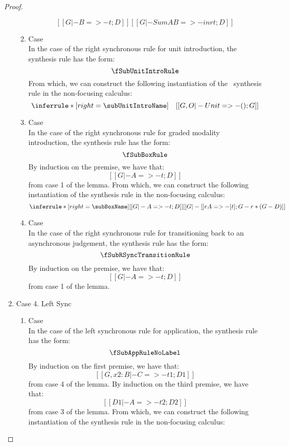 \begin{proof}
\begin{enumerate}
\begin{enumerate}
\[    {[[G |- B =>- t ; D]]}
    {[[G |- Sum A B =>- inr t ; D]]}
          \]
        \item Case \subUnitIntroName \\
          In the case of the right synchronous rule for unit introduction, the synthesis rule has the form:
          \[
          \fSubUnitIntroRule
          \]
          From which, we can construct the following instantiation of the \subUnitIntroName\ synthesis rule in the non-focusing calculus:
          \[
    \inferrule*[right=\subUnitIntroName]
    {\quad}
    {[[G , O |- Unit =>- () ; G]]}
          \]
        \item Case \subBoxName \\
          In the case of the right synchronous rule for graded modality introduction, the synthesis rule has the form:
          \[
          \fSubBoxRule
          \]
          By induction on the premise, we have that:
          \[
            [[G |- A =>- t ; D]] \tag{ih}
          \]
          from case 1 of the lemma. From which, we can construct the following instantiation of the \subBoxName synthesis rule in the non-focusing calculus:
          \[
  \inferrule*[right=\subBoxName]
  {[[G |- A =>- t ; D]]}{[[G |- [] r A =>- [t] ; G - r * (G - D)]]}
          \]
      \item Case \fSubRSyncTransitionName \\
          In the case of the right synchronous rule for transitioning back to an asynchronous judgement, the synthesis rule has the form:
          \[
            \fSubRSyncTransitionRule
          \]
          By induction on the premise, we have that:
          \[
            [[ G |- A =>- t ; D ]] \tag{ih}
          \]
          from case 1 of the lemma.
      \end{enumerate}
    \item Case 4. Left Sync \\
      \begin{enumerate}
          \item Case \subAppName \\
          In the case of the left synchronous rule for application, the synthesis rule has the form:
          \[
          \fSubAppRuleNoLabel
          \]
          By induction on the first premise, we have that:
          \[
            [[G, x2 : B |- C =>- t1 ; D1]] \tag{ih1}
          \]
          from case 4 of the lemma. By induction on the third premise, we have that:
          \[
            [[D1 |- A =>- t2 ; D2]] \tag{ih2}
          \]
          from case 3 of the lemma. From which, we can construct the following instantiation of the \subAppName synthesis rule in the non-focusing calculus:

\end{enumerate}
\end{enumerate}
\end{proof}

